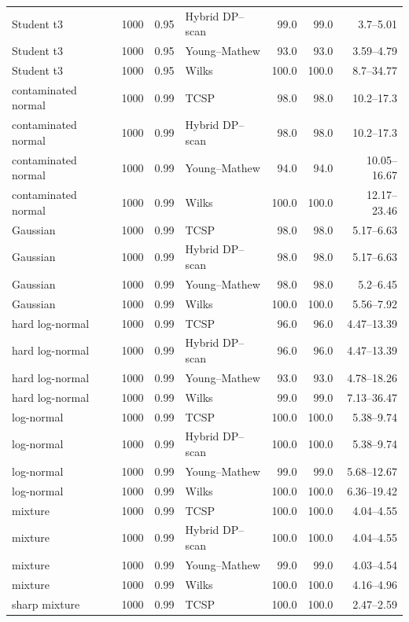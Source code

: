 \begin{longtable}{@{}p{}rrp{}rrr@{}}
Student t3 & 1000 & 0.95 & Hybrid DP--scan & 99.0 & 99.0 & 3.7--5.01 \\
Student t3 & 1000 & 0.95 & Young--Mathew & 93.0 & 93.0 & 3.59--4.79 \\
Student t3 & 1000 & 0.95 & Wilks & 100.0 & 100.0 & 8.7--34.77 \\
contaminated normal & 1000 & 0.99 & TCSP & 98.0 & 98.0 & 10.2--17.3 \\
contaminated normal & 1000 & 0.99 & Hybrid DP--scan & 98.0 & 98.0 & 10.2--17.3 \\
contaminated normal & 1000 & 0.99 & Young--Mathew & 94.0 & 94.0 & 10.05--16.67 \\
contaminated normal & 1000 & 0.99 & Wilks & 100.0 & 100.0 & 12.17--23.46 \\
Gaussian & 1000 & 0.99 & TCSP & 98.0 & 98.0 & 5.17--6.63 \\
Gaussian & 1000 & 0.99 & Hybrid DP--scan & 98.0 & 98.0 & 5.17--6.63 \\
Gaussian & 1000 & 0.99 & Young--Mathew & 98.0 & 98.0 & 5.2--6.45 \\
Gaussian & 1000 & 0.99 & Wilks & 100.0 & 100.0 & 5.56--7.92 \\
hard log-normal & 1000 & 0.99 & TCSP & 96.0 & 96.0 & 4.47--13.39 \\
hard log-normal & 1000 & 0.99 & Hybrid DP--scan & 96.0 & 96.0 & 4.47--13.39 \\
hard log-normal & 1000 & 0.99 & Young--Mathew & 93.0 & 93.0 & 4.78--18.26 \\
hard log-normal & 1000 & 0.99 & Wilks & 99.0 & 99.0 & 7.13--36.47 \\
log-normal & 1000 & 0.99 & TCSP & 100.0 & 100.0 & 5.38--9.74 \\
log-normal & 1000 & 0.99 & Hybrid DP--scan & 100.0 & 100.0 & 5.38--9.74 \\
log-normal & 1000 & 0.99 & Young--Mathew & 99.0 & 99.0 & 5.68--12.67 \\
log-normal & 1000 & 0.99 & Wilks & 100.0 & 100.0 & 6.36--19.42 \\
mixture & 1000 & 0.99 & TCSP & 100.0 & 100.0 & 4.04--4.55 \\
mixture & 1000 & 0.99 & Hybrid DP--scan & 100.0 & 100.0 & 4.04--4.55 \\
mixture & 1000 & 0.99 & Young--Mathew & 99.0 & 99.0 & 4.03--4.54 \\
mixture & 1000 & 0.99 & Wilks & 100.0 & 100.0 & 4.16--4.96 \\
sharp mixture & 1000 & 0.99 & TCSP & 100.0 & 100.0 & 2.47--2.59 \\

\end{longtable}
